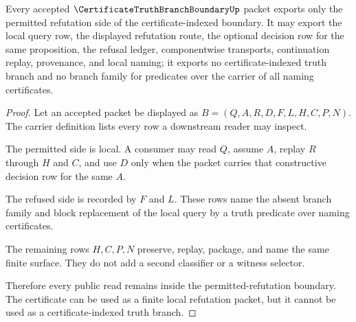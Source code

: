 \begin{theorem}
\label{thm:truth-branch-boundary-nonescape}
Every accepted $\CertificateTruthBranchBoundaryUp$ packet exports only the permitted refutation side of the certificate-indexed boundary. It may export the local query row, the displayed refutation route, the optional decision row for the same proposition, the refusal ledger, componentwise transports, continuation replay, provenance, and local naming; it exports no certificate-indexed truth branch and no branch family for predicates over the carrier of all naming certificates.
\end{theorem}
\begin{proof}
Let an accepted packet be displayed as $B=(Q,A,R,D,F,L,H,C,P,N)$. The carrier definition lists every row a downstream reader may inspect.

The permitted side is local. A consumer may read $Q$, assume $A$, replay $R$ through $H$ and $C$, and use $D$ only when the packet carries that constructive decision row for the same $A$.

The refused side is recorded by $F$ and $L$. These rows name the absent branch family and block replacement of the local query by a truth predicate over naming certificates.

The remaining rows $H,C,P,N$ preserve, replay, package, and name the same finite surface. They do not add a second classifier or a witness selector.

Therefore every public read remains inside the permitted-refutation boundary. The certificate can be used as a finite local refutation packet, but it cannot be used as a certificate-indexed truth branch.
\end{proof}

